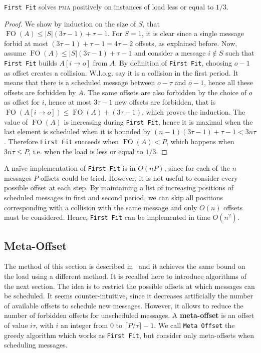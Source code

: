 \documentclass[a4paper,UKenglish,cleveref, autoref, thm-restate]{lipics-v2019}
\DeclareMathOperator{\Fo}{FO}
\newcommand\pma{\textsc{pma}\xspace}
\newcommand\firstfit{\texttt{First Fit}\xspace}
\newcommand\metaoffset{\texttt{Meta Offset}\xspace}
\begin{document}
\begin{theorem}
\firstfit solves \pma positively on instances of load less or equal to $1/3$. 
\end{theorem}
\begin{proof}
We show by induction on the size of $S$, that $\Fo(A) \leq |S|(3\tau -1) + \tau - 1$. For $S = 1$, it is clear since a single message forbid at most $(3\tau -1) + \tau -1 = 4\tau-2$ offsets, as explained before. Now, assume $\Fo(A) \leq |S|(3\tau -1) + \tau -1$ and consider a message $i \notin S$ such that \firstfit builds $A[i \rightarrow o]$ from $A$. By definition of \firstfit, choosing $o-1$ as offset creates a collision. W.l.o.g. say it is a collision in the first period. It means that there is a scheduled message between $o - \tau $ and $o-1$, hence all these offsets are forbidden by $A$. The same offsets are also forbidden by the choice of $o$ as offset for $i$, hence at most $3\tau -1$ new offsets are forbidden, that is $\Fo(A[i \rightarrow o]) \leq \Fo(A) + (3\tau -1)$, which proves the induction. 
The value of $\Fo(A)$ is increasing during \firstfit, hence it is maximal when the last element is scheduled when it is bounded by $(n-1)(3\tau -1) + \tau - 1 < 3n\tau$.
Therefore \firstfit succeeds when $\Fo(A) < P$, which happens when $3n\tau \leq P$, i.e. when the load is less or equal to $1/3$.
\end{proof}


A naïve implementation of \firstfit is in $O(nP)$, since for each of the $n$ messages $P$ offsets could be tried.
However, it is not useful to consider every possible offset at each step. By maintaining a list of increasing positions of scheduled messages in first and second period, 
we can skip all positions corresponding with a collision with the same message and only $O(n)$ offsets must be considered. Hence, \firstfit can be implemented in time $O(n^2)$.

\subsection{Meta-Offset}

The method of this section is described in~\cite{dominique2018deterministic} and it achieves the same bound on the load using a different method. It is recalled here to introduce algorithms of the next section.
The idea is to restrict the possible offsets at which messages can be scheduled. It seems counter-intuitive, since it decreases artificially the number of available offsets to schedule new messages. However, it allows to reduce the number of forbidden offsets for unscheduled messages. A \textbf{meta-offset} is an offset of value $i\tau$,
with $i$ an integer from $0$ to $\lceil P / \tau \rceil - 1$. We call \metaoffset the greedy algorithm which works as \firstfit, but consider only meta-offsets when scheduling messages. 
\end{document}
